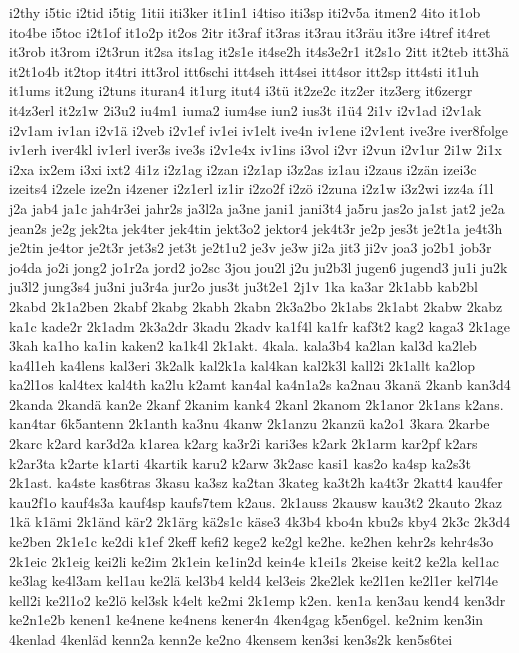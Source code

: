 {i2thy
i5tic
i2tid
i5tig
1itii
iti3ker
it1in1
i4tiso
iti3sp
iti2v5a
itmen2
4ito
it1ob
ito4be
i5toc
i2t1of
it1o2p
it2os
2itr
it3raf
it3ras
it3rau
it3räu
it3re
i4tref
it4ret
it3rob
it3rom
i2t3run
it2sa
its1ag
it2s1e
it4se2h
it4s3e2r1
it2s1o
2itt
it2teb
itt3hä
it2t1o4b
it2top
it4tri
itt3rol
itt6schi
itt4seh
itt4sei
itt4sor
itt2sp
itt4sti
it1uh
it1ums
it2ung
i2tuns
ituran4
it1urg
itut4
i3tü
it2ze2c
itz2er
itz3erg
it6zergr
it4z3erl
it2z1w
2i3u2
iu4m1
iuma2
ium4se
iun2
ius3t
i1ü4
2i1v
i2v1ad
i2v1ak
i2v1am
iv1an
i2v1ä
i2veb
i2v1ef
iv1ei
iv1elt
ive4n
iv1ene
i2v1ent
ive3re
iver8folge
iv1erh
iver4kl
iv1erl
iver3s
ive3s
i2v1e4x
iv1ins
i3vol
i2vr
i2vun
i2v1ur
2i1w
2i1x
i2xa
ix2em
i3xi
ixt2
4i1z
i2z1ag
i2zan
i2z1ap
i3z2as
iz1au
i2zaus
i2zän
izei3c
izeits4
i2zele
ize2n
i4zener
i2z1erl
iz1ir
i2zo2f
i2zö
i2zuna
i2z1w
i3z2wi
izz4a
í1l
j2a
jab4
ja1c
jah4r3ei
jahr2s
ja3l2a
ja3ne
jani1
jani3t4
ja5ru
jas2o
ja1st
jat2
je2a
jean2s
je2g
jek2ta
jek4ter
jek4tin
jekt3o2
jektor4
jek4t3r
je2p
jes3t
je2t1a
je4t3h
je2tin
je4tor
je2t3r
jet3s2
jet3t
je2t1u2
je3v
je3w
ji2a
jit3
ji2v
joa3
jo2b1
job3r
jo4da
jo2i
jong2
jo1r2a
jord2
jo2sc
3jou
jou2l
j2u
ju2b3l
jugen6
jugend3
ju1i
ju2k
ju3l2
jung3s4
ju3ni
ju3r4a
jur2o
jus3t
ju3t2e1
2j1v
1ka
ka3ar
2k1abb
kab2bl
2kabd
2k1a2ben
2kabf
2kabg
2kabh
2kabn
2k3a2bo
2k1abs
2k1abt
2kabw
2kabz
ka1c
kade2r
2k1adm
2k3a2dr
3kadu
2kadv
ka1f4l
ka1fr
kaf3t2
kag2
kaga3
2k1age
3kah
ka1ho
ka1in
kaken2
ka1k4l
2k1akt.
4kala.
kala3b4
ka2lan
kal3d
ka2leb
ka4l1eh
ka4lens
kal3eri
3k2alk
kal2k1a
kal4kan
kal2k3l
kall2i
2k1allt
ka2lop
ka2l1os
kal4tex
kal4th
ka2lu
k2amt
kan4al
ka4n1a2s
ka2nau
3kanä
2kanb
kan3d4
2kanda
2kandä
kan2e
2kanf
2kanim
kank4
2kanl
2kanom
2k1anor
2k1ans
k2ans.
kan4tar
6k5antenn
2k1anth
ka3nu
4kanw
2k1anzu
2kanzü
ka2o1
3kara
2karbe
2karc
k2ard
kar3d2a
k1area
k2arg
ka3r2i
kari3es
k2ark
2k1arm
kar2pf
k2ars
k2ar3ta
k2arte
k1arti
4kartik
karu2
k2arw
3k2asc
kasi1
kas2o
ka4sp
ka2s3t
2k1ast.
ka4ste
kas6tras
3kasu
ka3sz
ka2tan
3kateg
ka3t2h
ka4t3r
2katt4
kau4fer
kau2f1o
kauf4s3a
kauf4sp
kaufs7tem
k2aus.
2k1auss
2kausw
kau3t2
2kauto
2kaz
1kä
k1ämi
2k1änd
kär2
2k1ärg
kä2s1c
käse3
4k3b4
kbo4n
kbu2s
kby4
2k3c
2k3d4
ke2ben
2k1e1c
ke2di
k1ef
2keff
kefi2
kege2
ke2gl
ke2he.
ke2hen
kehr2s
kehr4s3o
2k1eic
2k1eig
kei2li
ke2im
2k1ein
ke1in2d
kein4e
k1ei1s
2keise
keit2
ke2la
kel1ac
ke3lag
ke4l3am
kel1au
ke2lä
kel3b4
keld4
kel3eis
2ke2lek
ke2l1en
ke2l1er
kel7l4e
kell2i
ke2l1o2
ke2lö
kel3sk
k4elt
ke2mi
2k1emp
k2en.
ken1a
ken3au
kend4
ken3dr
ke2n1e2b
kenen1
ke4nene
ke4nens
kener4n
4ken4gag
k5en6gel.
ke2nim
ken3in
4kenlad
4kenläd
kenn2a
kenn2e
ke2no
4kensem
ken3si
ken3s2k
ken5s6tei
}
